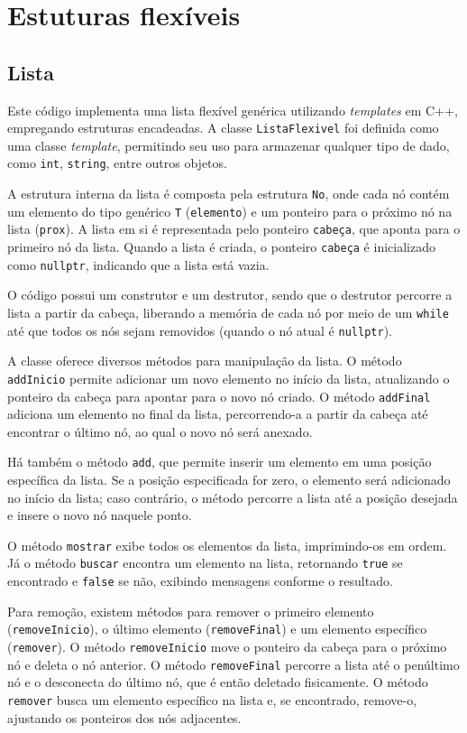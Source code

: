 \documentclass[12pt]{article}
\begin{document}
\section{Estuturas flexíveis}

\subsection{Lista}
Este código implementa uma lista flexível genérica utilizando \emph{templates} em C++, empregando estruturas encadeadas. A classe \texttt{ListaFlexivel} foi definida como uma classe \emph{template}, permitindo seu uso para armazenar qualquer tipo de dado, como \texttt{int}, \texttt{string}, entre outros objetos.

A estrutura interna da lista é composta pela estrutura \texttt{No}, onde cada nó contém um elemento do tipo genérico \texttt{T} (\texttt{elemento}) e um ponteiro para o próximo nó na lista (\texttt{prox}). A lista em si é representada pelo ponteiro \texttt{cabeça}, que aponta para o primeiro nó da lista. Quando a lista é criada, o ponteiro \texttt{cabeça} é inicializado como \texttt{nullptr}, indicando que a lista está vazia. 

O código possui um construtor e um destrutor, sendo que o destrutor percorre a lista a partir da cabeça, liberando a memória de cada nó por meio de um \texttt{while} até que todos os nós sejam removidos (quando o nó atual é \texttt{nullptr}).

A classe oferece diversos métodos para manipulação da lista. O método \texttt{addInicio} permite adicionar um novo elemento no início da lista, atualizando o ponteiro da cabeça para apontar para o novo nó criado. O método \texttt{addFinal} adiciona um elemento no final da lista, percorrendo-a a partir da cabeça até encontrar o último nó, ao qual o novo nó será anexado.

Há também o método \texttt{add}, que permite inserir um elemento em uma posição específica da lista. Se a posição especificada for zero, o elemento será adicionado no início da lista; caso contrário, o método percorre a lista até a posição desejada e insere o novo nó naquele ponto.

O método \texttt{mostrar} exibe todos os elementos da lista, imprimindo-os em ordem. Já o método \texttt{buscar} encontra um elemento na lista, retornando \texttt{true} se encontrado e \texttt{false} se não, exibindo mensagens conforme o resultado.

Para remoção, existem métodos para remover o primeiro elemento (\texttt{removeInicio}), o último elemento (\texttt{removeFinal}) e um elemento específico (\texttt{remover}). O método \texttt{removeInicio} move o ponteiro da cabeça para o próximo nó e deleta o nó anterior. O método \texttt{removeFinal} percorre a lista até o penúltimo nó e o desconecta do último nó, que é então deletado fisicamente. O método \texttt{remover} busca um elemento específico na lista e, se encontrado, remove-o, ajustando os ponteiros dos nós adjacentes.
\end{document}
